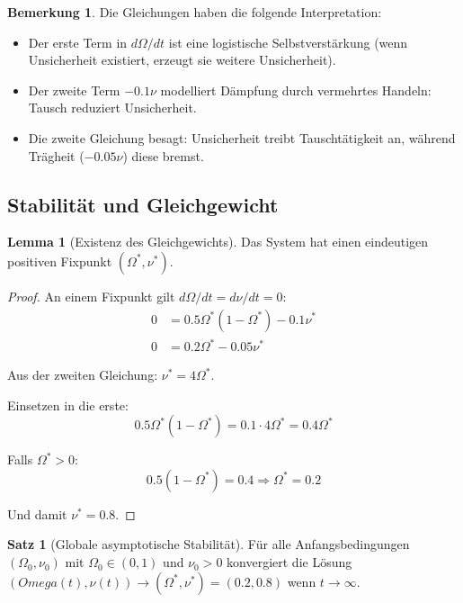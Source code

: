 \documentclass[a4paper,12pt]{article}
\theoremstyle{definition}
\newtheorem{satz}{Satz}
\newtheorem{lemma}{Lemma}
\newtheorem{bemerkung}{Bemerkung}
\begin{document}
\begin{bemerkung}
    Die Gleichungen haben die folgende Interpretation:
    \begin{itemize}
        \item Der erste Term in $d\Omega/dt$ ist eine logistische Selbstverstärkung (wenn Unsicherheit existiert, erzeugt sie weitere Unsicherheit).
        \item Der zweite Term $-0.1\nu$ modelliert Dämpfung durch vermehrtes Handeln: Tausch reduziert Unsicherheit.
        \item Die zweite Gleichung besagt: Unsicherheit treibt Tauschtätigkeit an, während Trägheit ($-0.05\nu$) diese bremst.
    \end{itemize}
\end{bemerkung}

\subsection{Stabilität und Gleichgewicht}

\begin{lemma}[Existenz des Gleichgewichts]
    Das System hat einen eindeutigen positiven Fixpunkt $(\Omega^*, \nu^*)$.
\end{lemma}

\begin{proof}
    An einem Fixpunkt gilt $d\Omega/dt = d\nu/dt = 0$:
    \begin{align}
        0 &= 0.5\Omega^*(1-\Omega^*) - 0.1\nu^* \\
        0 &= 0.2\Omega^* - 0.05\nu^*
    \end{align}
    
    Aus der zweiten Gleichung: $\nu^* = 4\Omega^*$.
    
    Einsetzen in die erste:
    \begin{equation}
        0.5\Omega^*(1-\Omega^*) = 0.1 \cdot 4\Omega^* = 0.4\Omega^*
    \end{equation}
    
    Falls $\Omega^* > 0$:
    \begin{equation}
        0.5(1-\Omega^*) = 0.4 \Rightarrow \Omega^* = 0.2
    \end{equation}
    
    Und damit $\nu^* = 0.8$.
\end{proof}

\begin{satz}[Globale asymptotische Stabilität]
    Für alle Anfangsbedingungen $(\Omega_0, \nu_0)$ mit $\Omega_0 \in (0,1)$ und $\nu_0 > 0$ konvergiert die Lösung $(Omega(t), \nu(t)) \to (\Omega^*, \nu^*) = (0.2, 0.8)$ wenn $t \to \infty$.
\end{satz}
\end{document}
